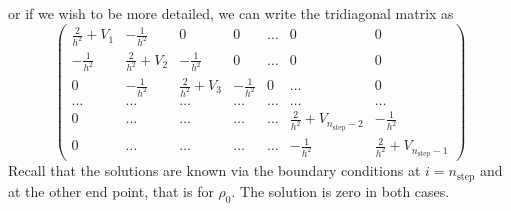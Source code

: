 \documentclass[graybox,envcountchap,sectrefs]{svmult}
\begin{document}
or if we wish to be more detailed, we can write the tridiagonal matrix as
\begin{equation}
    \left( \begin{array}{ccccccc} \frac{2}{h^2}+V_1 & -\frac{1}{h^2} & 0   & 0    & \dots  &0     & 0 \\
                                -\frac{1}{h^2} & \frac{2}{h^2}+V_2 & -\frac{1}{h^2} & 0    & \dots  &0     &0 \\
                                0   & -\frac{1}{h^2} & \frac{2}{h^2}+V_3 & -\frac{1}{h^2}  &0       &\dots & 0\\
                                \dots  & \dots & \dots & \dots  &\dots      &\dots & \dots\\
                                0   & \dots & \dots & \dots  &\dots       &\frac{2}{h^2}+V_{n_{\mathrm{step}}-2} & -\frac{1}{h^2}\\
                                0   & \dots & \dots & \dots  &\dots       &-\frac{1}{h^2} & \frac{2}{h^2}+V_{n_{\mathrm{step}}-1}
             \end{array} \right)
\label{eq:matrixse}
\end{equation}
Recall that the solutions are known via the boundary conditions at
$i=n_{\mathrm{step}}$ and at the other end point, that is for  $\rho_0$.
The solution is zero in both cases.
\end{document}
